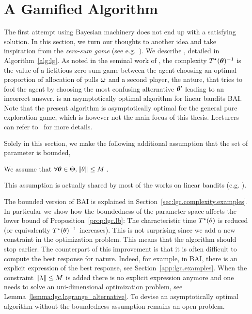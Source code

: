 \section{A Gamified Algorithm}\label{sec:lgc.game}

The first attempt using Bayesian machinery does not end up with a satisfying solution. In this section, we turn our thoughts to another idea and take inspiration from the \emph{zero-sum game} (see e.g.~\citealt{degenne2019pure}). We describe \LG{}, detailed in Algorithm~\ref{alg:lg}. As noted in the seminal work of \citet{chernoff1959}, the complexity $T^{\star}({\boldsymbol \theta})^{-1}$ is the value of a fictitious zero-sum game between the agent choosing an optimal proportion of allocation of pulls ${\boldsymbol \omega}$ and a second player, the nature, that tries to fool the agent by choosing the most confusing alternative ${\boldsymbol \theta}'$ leading to an incorrect answer. \LG{} is an asymptotically optimal algorithm for linear bandits BAI. Note that the present algorithm is asymptotically optimal for the general pure exploration game, which is however not the main focus of this thesis. Lecturers can refer to~\cite{degenne2020game} for more details.


Solely in this section, we make the following additional assumption that the set of parameter is bounded,
\begin{assumption}
\begin{leftbar}[assumptionbar]
    We assume that $\forall {\boldsymbol \theta}\in\Theta, \left\lVert\theta\right\rVert\leq M$\,.
\end{leftbar}
\end{assumption}
This assumption is actually shared by most of the works on linear bandits (e.g. \citealt{abbasi-yadkori2011linear, soare2014linear}).

The bounded version of BAI is explained in Section~\ref{sec:lgc.complexity.examples}. In particular we show how the boundedness of the parameter space affects the lower bound of Proposition~\ref{prop:lgc.lb}: The characteristic time $T^{\star}(\theta)$ is reduced (or equivalently $T^{\star}(\theta)^{-1}$ increases). This is not surprising since we add a new constraint in the optimization problem. This means that the algorithm should stop earlier. The counterpart of this improvement is that it is often difficult to compute the best response for nature. Indeed, for example, in BAI, there is an explicit expression of the best response, see Section~\ref{app:lgc.examples}. When the constraint $\left\lVert\lambda\right\rVert\leq M$ is added there is no explicit expression anymore and one needs to solve an uni-dimensional optimization problem, see Lemma~\ref{lemma:lgc.lagrange_alternative}. To devise an asymptotically optimal algorithm without the boundedness assumption remains an open problem.


